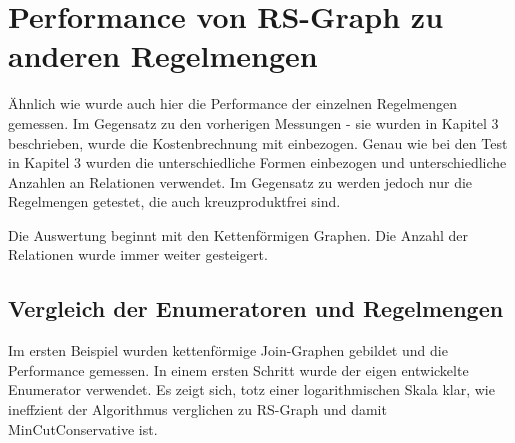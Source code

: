 \section{Performance von RS-Graph zu anderen Regelmengen}


Ähnlich wie \cite{shanbhag2014optimizing} wurde auch hier die Performance der einzelnen Regelmengen gemessen. Im Gegensatz zu den vorherigen Messungen - sie wurden in Kapitel 3 beschrieben, wurde die Kostenbrechnung mit einbezogen. Genau wie bei den Test in Kapitel 3 wurden die unterschiedliche Formen einbezogen und unterschiedliche Anzahlen an Relationen verwendet. Im Gegensatz zu \cite{shanbhag2014optimizing} werden jedoch nur die Regelmengen getestet, die auch kreuzproduktfrei sind. 

Die Auswertung beginnt mit den Kettenförmigen Graphen. Die Anzahl der Relationen wurde immer weiter gesteigert.


\subsection{Vergleich der Enumeratoren und Regelmengen}

Im ersten Beispiel wurden kettenförmige Join-Graphen gebildet und die Performance gemessen. In einem ersten Schritt wurde der eigen entwickelte Enumerator verwendet. Es zeigt sich, totz einer logarithmischen Skala klar, wie ineffzient der Algorithmus verglichen zu RS-Graph und damit MinCutConservative ist.


